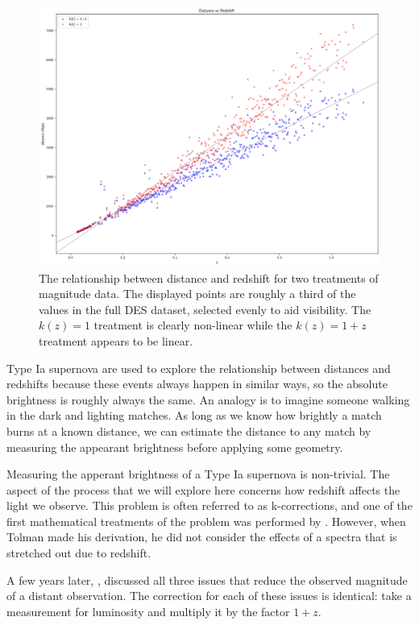 \documentclass{article}
\begin{document}
\begin{figure}[h]
  \includegraphics[width=\linewidth]{mu_distance_vs_redshift.png}
  \caption{The relationship between distance and redshift for two treatments of
  magnitude data. The displayed points are roughly a third of the values in the
  full DES dataset, selected evenly to aid visibility. The $k(z) = 1$ treatment
  is clearly non-linear while the $k(z) = 1 + z$ treatment appears to be
  linear.}
  \label{fig:mu_distance_vs_redshift}
\end{figure}

Type Ia supernova are used to explore the relationship between distances and
redshifts because these events always happen in similar ways, so the absolute
brightness is roughly always the same. An analogy is to imagine someone walking
in the dark and lighting matches. As long as we know how brightly a match burns
at a known distance, we can estimate the distance to any match by measuring the
appearant brightness before applying some geometry.

Measuring the apperant brightness of a Type Ia supernova is non-trivial. The
aspect of the process that we will explore here concerns how redshift affects
the light we observe. This problem is often referred to as k-corrections, and
one of the first mathematical treatments of the problem was performed by
\citet{tolman1930}. However, when Tolman made his derivation, he did not
consider the effects of a spectra that is stretched out due to redshift.

A few years later, \citet{desitter1934}, discussed all three issues that reduce
the observed magnitude of a distant observation. The correction for each of
these issues is identical: take a measurement for luminosity and multiply it by
the factor $1 + z$.
\end{document}
